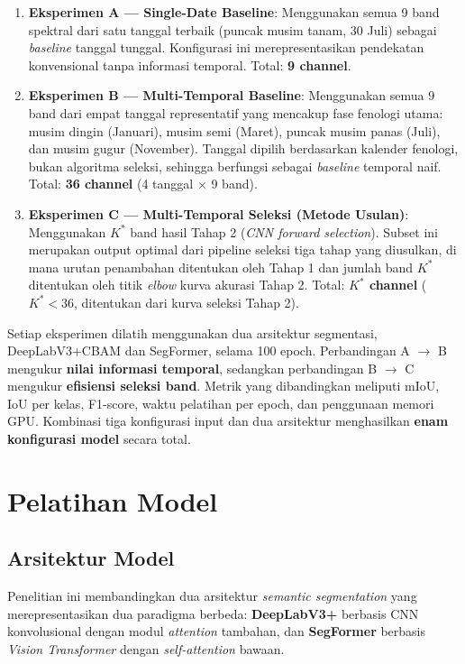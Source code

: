 \begin{enumerate}
    \item \textbf{Eksperimen A — Single-Date Baseline}:
    Menggunakan semua 9 band spektral dari satu tanggal terbaik (puncak musim tanam, 30 Juli) sebagai \textit{baseline} tanggal tunggal.
    Konfigurasi ini merepresentasikan pendekatan konvensional tanpa informasi temporal.
    Total: \textbf{9 channel}.

    \item \textbf{Eksperimen B — Multi-Temporal Baseline}:
    Menggunakan semua 9 band dari empat tanggal representatif yang mencakup fase fenologi utama: musim dingin (Januari), musim semi (Maret), puncak musim panas (Juli), dan musim gugur (November).
    Tanggal dipilih berdasarkan kalender fenologi, bukan algoritma seleksi, sehingga berfungsi sebagai \textit{baseline} temporal naif.
    Total: \textbf{36 channel} (4 tanggal $\times$ 9 band).

    \item \textbf{Eksperimen C — Multi-Temporal Seleksi (Metode Usulan)}:
    Menggunakan $K^*$ band hasil Tahap 2 (\textit{CNN forward selection}).
    Subset ini merupakan output optimal dari pipeline seleksi tiga tahap yang diusulkan, di mana urutan penambahan ditentukan oleh Tahap 1 dan jumlah band $K^*$ ditentukan oleh titik \textit{elbow} kurva akurasi Tahap 2.
    Total: \textbf{$K^*$ channel} ($K^* < 36$, ditentukan dari kurva seleksi Tahap 2).
\end{enumerate}

Setiap eksperimen dilatih menggunakan dua arsitektur segmentasi, DeepLabV3+CBAM dan SegFormer, selama 100 epoch.
Perbandingan A $\to$ B mengukur \textbf{nilai informasi temporal}, sedangkan perbandingan B $\to$ C mengukur \textbf{efisiensi seleksi band}.
Metrik yang dibandingkan meliputi mIoU, IoU per kelas, F1-score, waktu pelatihan per epoch, dan penggunaan memori GPU.
Kombinasi tiga konfigurasi input dan dua arsitektur menghasilkan \textbf{enam konfigurasi model} secara total.

\section{Pelatihan Model}

\subsection{Arsitektur Model}

Penelitian ini membandingkan dua arsitektur \textit{semantic segmentation} yang merepresentasikan dua paradigma berbeda: \textbf{DeepLabV3+} berbasis CNN konvolusional dengan modul \textit{attention} tambahan, dan \textbf{SegFormer} berbasis \textit{Vision Transformer} dengan \textit{self-attention} bawaan.

